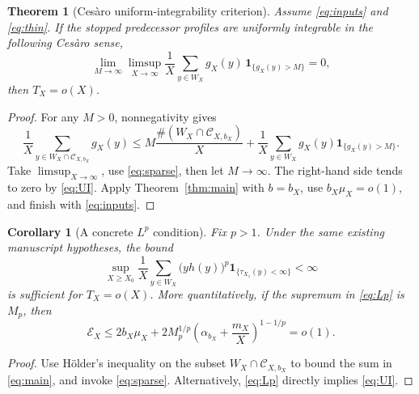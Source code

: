 \documentclass[11pt,a4paper]{article}
\newtheorem{theorem}{Theorem}
\newtheorem{corollary}{Corollary}
\newcommand{\EX}{\mathcal E_X}
\newcommand{\1}{\mathbf 1}
\begin{document}
\begin{theorem}[Ces\`aro uniform-integrability criterion]\label{thm:UI}
Assume \eqref{eq:inputs} and \eqref{eq:thin}. If the stopped predecessor profiles are uniformly integrable in the following \emph{Ces\`aro} sense,
\begin{equation}\label{eq:UI}
 \lim_{M\to\infty}\limsup_{X\to\infty}\frac1X
 \sum_{y\in W_X}g_X(y)\,\1_{\{g_X(y)>M\}}=0,
\end{equation}
then $T_X=o(X)$.
\end{theorem}
\begin{proof}
For any $M>0$, nonnegativity gives
\[
 \frac1X\sum_{y\in W_X\cap\mathcal C_{X,b_X}}g_X(y)
 \le M\frac{\#(W_X\cap\mathcal C_{X,b_X})}{X}
 +\frac1X\sum_{y\in W_X}g_X(y)\1_{\{g_X(y)>M\}}.
\]
Take $\limsup_{X\to\infty}$, use \eqref{eq:sparse}, then let $M\to\infty$. The right-hand side tends to zero by \eqref{eq:UI}. Apply Theorem~\ref{thm:main} with $b=b_X$, use $b_X\mu_X=o(1)$, and finish with \eqref{eq:inputs}.
\end{proof}

\begin{corollary}[A concrete $L^p$ condition]\label{cor:Lp}
Fix $p>1$. Under the same existing manuscript hypotheses, the bound
\begin{equation}\label{eq:Lp}
 \sup_{X\ge X_0}\frac1X\sum_{y\in W_X}\bigl(yh(y)\bigr)^p
 \1_{\{\tau_{X_1}(y)<\infty\}}<\infty
\end{equation}
is sufficient for $T_X=o(X)$. More quantitatively, if the supremum in \eqref{eq:Lp} is $M_p$, then
\[
 \EX\le 2b_X\mu_X+2M_p^{1/p}
 \left(\alpha_{b_X}+\frac{m_X}{X}\right)^{1-1/p}=o(1).
\]
\end{corollary}
\begin{proof}
Use H\"older's inequality on the subset $W_X\cap\mathcal C_{X,b_X}$ to bound the sum in \eqref{eq:main}, and invoke \eqref{eq:sparse}. Alternatively, \eqref{eq:Lp} directly implies \eqref{eq:UI}.
\end{proof}
\end{document}

